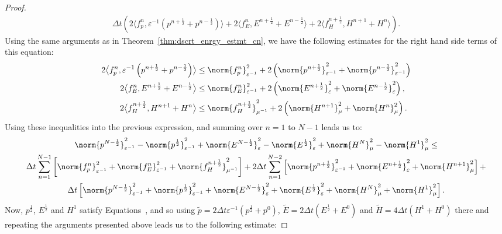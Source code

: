 \documentclass{amsart}
\theoremstyle{thmstyleone}%
\theoremstyle{thmstyletwo}%
\theoremstyle{thmstylethree}%
\newcommand{\aInnerproduct}[2]{\bigl\langle #1, #2 \bigr\rangle}
\begin{document}
\begin{proof}
\begin{multline*}
\Delta t \left( 2 \aInnerproduct{f_p^n}{\varepsilon^{-1} \left(p^{n + \frac{1}{2}} + p^{n - \frac{1}{2}} \right)} + 2 \aInnerproduct{f_E^n}{E^{n + \frac{1}{2}} + E^{n - \frac{1}{2}}} + 2 \aInnerproduct{f_H^{n + \frac{1}{2}}}{H^{n + 1} + H^n} \right).
\end{multline*}
Using the same arguments as in Theorem~\ref{thm:dscrt_enrgy_estmt_cn}, we have the following estimates for the right hand side terms of this equation:
\begin{align*}
2 \aInnerproduct{f_p^n}{\varepsilon^{-1} \left(p^{n + \frac{1}{2}} + p^{n - \frac{1}{2}} \right)} &\le \norm{f_p^n}^2_{\varepsilon^{-1}} + 2 \left( \norm{p^{n + \frac{1}{2}}}^2_{\varepsilon^{-1}} + \norm{p^{n - \frac{1}{2}}}^2_{\varepsilon^{-1}} \right) \\
2 \aInnerproduct{f_E^n}{E^{n + \frac{1}{2}} + E^{n - \frac{1}{2}}} &\le \norm{f_E^n}^2_{\varepsilon^{-1}} + 2 \left( \norm{E^{n + \frac{1}{2}}}^2_{\varepsilon} + \norm{E^{n - \frac{1}{2}}}^2_{\varepsilon} \right), \\ 
2 \aInnerproduct{f_H^{n + \frac{1}{2}}}{H^{n + 1} + H^n} &\le \norm{f_H^{n + \frac{1}{2}}}^2_{\mu^{-1}} + 2 \left( \norm{H^{n + 1}}^2_{\mu} + \norm{H^n}^2_{\mu} \right).
\end{align*}
Using these inequalities into the previous expression, and summing over $n = 1$ to $N - 1$ leads us to:
\begin{multline*}
  \norm{p^{N - \frac{1}{2}}}^2_{\varepsilon^{-1}} - \norm{p^\frac{1}{2}}^2_{\varepsilon^{-1}} + \norm{E^{N - \frac{1}{2}}}^2_{\varepsilon} - \norm{E^\frac{1}{2}}^2_{\varepsilon} + \norm{H^N}^2_{\mu} - \norm{H^1}^2_{\mu} \le \\
  \Delta t \sum\limits_{n = 1}^{N - 1} \left[ \norm{f_p^n}^2_{\varepsilon^{-1}} + \norm{f_E^n}^2_{\varepsilon^{-1}} + \norm{f_H^{n + \frac{1}{2}}}^2_{\mu^{-1}} \right] + 
  2 \Delta t \sum\limits_{n = 1}^{N - 2} \left[ \norm{p^{n + \frac{1}{2}}}^2_{\varepsilon^{-1}} + \norm{E^{n + \frac{1}{2}}}^2_{\varepsilon} + \norm{H^{n + 1}}^2_{\mu} \right] + \\
  \Delta t \left[ \norm{p^{N - \frac{1}{2}}}^2_{\varepsilon^{-1}} + \norm{p^{\frac{1}{2}}}^2_{\varepsilon^{-1}} + \norm{E^{N - \frac{1}{2}}}^2_{\varepsilon} + \norm{E^{\frac{1}{2}}}^2_{\varepsilon} + \norm{H^N}^2_{\mu} + \norm{H^1}^2_{\mu} \right]. %
\end{multline*}
Now, $p^{\frac{1}{2}}$, $E^{\frac{1}{2}}$ and $H^1$ satisfy Equations~, and so using $\widetilde{p} = 2 \Delta t \varepsilon^{-1} \left( p^{\frac{1}{2}} + p^0 \right)$, $\widetilde{E} = 2 \Delta t \left(E^{\frac{1}{2}} + E^0 \right)$ and $\widetilde{H} = 4 \Delta t \left(H^{1} + H^0 \right)$ there and repeating the arguments presented above leads us to the following estimate:

\end{proof}
\end{document}

